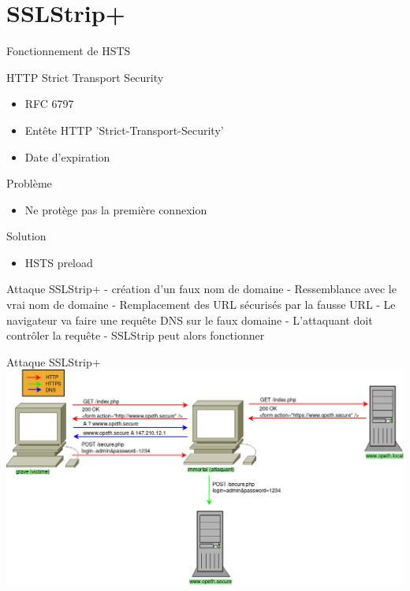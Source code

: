 \section{SSLStrip+}

\begin{frame}{Fonctionnement de HSTS}
  \begin{exampleblock}{HTTP Strict Transport Security}
    \begin{itemize}
    \item RFC 6797
    \item Entête HTTP 'Strict-Transport-Security'
    \item Date d'expiration
    \end{itemize}
  \end{exampleblock}

  \begin{alertblock}{Problème}
    \begin{itemize}
    \item Ne protège pas la première connexion
    \end{itemize}
  \end{alertblock}

  \begin{block}{Solution}
    \begin{itemize}
    \item HSTS preload
    \end{itemize}
  \end{block}

\end{frame}

\begin{frame}{Attaque SSLStrip+}
  - création d'un faux nom de domaine
  - Ressemblance avec le vrai nom de domaine
  - Remplacement des URL sécurisés par la fausse URL
  - Le navigateur va faire une requête DNS sur le faux domaine
  - L'attaquant doit contrôler la requête
  - SSLStrip peut alors fonctionner
\end{frame}

\begin{frame}{Attaque SSLStrip+}
    \includegraphics[width=\linewidth]{../medias/sslstrip2/attack.png}
\end{frame}
